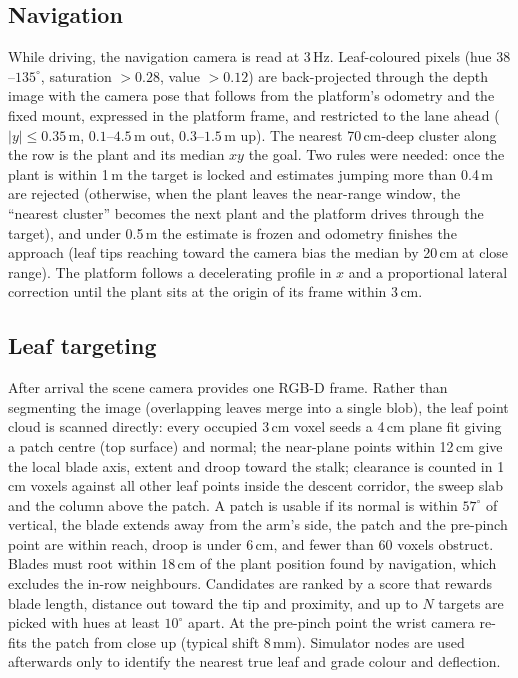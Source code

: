 \documentclass[letterpaper, 10 pt, conference]{ieeeconf}
\begin{document}
\subsection{Navigation}
While driving, the navigation camera is read at 3\,Hz. Leaf-coloured pixels
(hue $38$--$135^\circ$, saturation $>0.28$, value $>0.12$) are back-projected through the
depth image with the camera pose that follows from the platform's odometry and the fixed
mount, expressed in the platform frame, and restricted to the lane ahead ($|y|\le0.35$\,m,
$0.1$--$4.5$\,m out, $0.3$--$1.5$\,m up). The nearest 70\,cm-deep cluster along the row is the
plant and its median $xy$ the goal. Two rules were needed: once the plant is within 1\,m the
target is locked and estimates jumping more than 0.4\,m are rejected (otherwise, when the
plant leaves the near-range window, the ``nearest cluster'' becomes the next plant and the
platform drives through the target), and under 0.5\,m the estimate is frozen and odometry
finishes the approach (leaf tips reaching toward the camera bias the median by 20\,cm at
close range). The platform follows a decelerating profile in $x$ and a proportional lateral
correction until the plant sits at the origin of its frame within 3\,cm.

\subsection{Leaf targeting}
After arrival the scene camera provides one RGB-D frame. Rather than segmenting the image
(overlapping leaves merge into a single blob), the leaf point cloud is scanned directly:
every occupied 3\,cm voxel seeds a 4\,cm plane fit giving a patch centre (top surface) and
normal; the near-plane points within 12\,cm give the local blade axis, extent and droop
toward the stalk; clearance is counted in 1\,cm voxels against all other leaf points inside
the descent corridor, the sweep slab and the column above the patch. A patch is usable if
its normal is within $57^\circ$ of vertical, the blade extends away from the arm's side, the
patch and the pre-pinch point are within reach, droop is under 6\,cm, and fewer than 60
voxels obstruct. Blades must root within 18\,cm of the plant position found by navigation,
which excludes the in-row neighbours. Candidates are ranked by a score that rewards blade
length, distance out toward the tip and proximity, and up to $N$ targets are picked with
hues at least $10^\circ$ apart. At the pre-pinch point the wrist camera re-fits the patch
from close up (typical shift 8\,mm). Simulator nodes are used afterwards only to identify
the nearest true leaf and grade colour and deflection.
\end{document}
